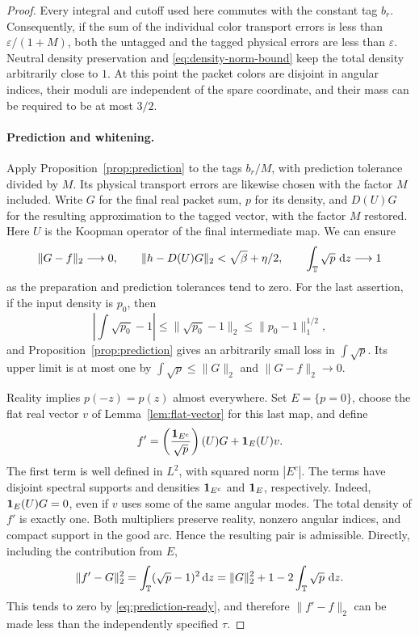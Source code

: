 \begin{proof}
Every integral and cutoff used here commutes with the constant tag
$b_r$.  Consequently, if the sum of the individual color transport
errors is less than $\varepsilon/(1+M)$, both the untagged and the
tagged physical errors are less than $\varepsilon$.  Neutral density
preservation and \eqref{eq:density-norm-bound} keep the total density
arbitrarily close to $1$.  At this point the packet colors are disjoint
in angular indices, their moduli are independent of the spare
coordinate, and their mass can be required to be at most $3/2$.

\paragraph{Prediction and whitening.}
Apply Proposition~\ref{prop:prediction} to the tags $b_r/M$, with
prediction tolerance divided by $M$.  Its physical transport errors
are likewise chosen with the factor $M$ included.  Write $G$ for the
final real packet sum, $p$ for its density, and $D(U)G$ for the
resulting approximation to the tagged vector, with the factor $M$
restored.  Here $U$ is the Koopman operator of the final intermediate
map.  We can ensure
\begin{equation}\label{eq:prediction-ready}
 \|G-f\|_2\longrightarrow0,
 \qquad
 \|h-D(U)G\|_2<\sqrt\beta+\eta/2,
 \qquad
 \int_\mathbb T\sqrt p\,\,\mathrm d z\longrightarrow1
\end{equation}
as the preparation and prediction tolerances tend to zero.  For the
last assertion, if the input density is $p_0$, then
\[
 \left|\int\sqrt{p_0}-1\right|
 \le\|\sqrt{p_0}-1\|_2
 \le\|p_0-1\|_1^{1/2},
\]
and Proposition~\ref{prop:prediction} gives an arbitrarily small loss
in $\int\sqrt p$.  Its upper limit is at most one by
$\int\sqrt p\le\|G\|_2$ and $\|G-f\|_2\to0$.

Reality implies $p(-z)=p(z)$ almost everywhere.  Set $E=\{p=0\}$,
choose the flat real vector $v$ of Lemma~\ref{lem:flat-vector} for this
last map, and define
\begin{equation}\label{eq:whitening}
 f'=\left(\frac{\mathbf 1_{E^c}}{\sqrt p}\right)(U)G+\mathbf 1_E(U)v.
\end{equation}
The first term is well defined in $L^2$, with squared norm $|E^c|$.
The terms have disjoint spectral supports and densities $\mathbf 1_{E^c}$
and $\mathbf 1_E$, respectively.  Indeed, $\mathbf 1_E(U)G=0$, even if $v$ uses some
of the same angular modes.  The total density of $f'$ is exactly one.
Both multipliers preserve reality, nonzero angular indices, and compact
support in the good arc.  Hence the resulting pair is admissible.
Directly, including the contribution from $E$,
\begin{equation}\label{eq:whitening-distance}
 \|f'-G\|_2^2
 =\int_\mathbb T(\sqrt p-1)^2\,\mathrm d z
 =\|G\|_2^2+1-2\int_\mathbb T\sqrt p\,\,\mathrm d z.
\end{equation}
This tends to zero by \eqref{eq:prediction-ready}, and therefore
$\|f'-f\|_2$ can be made less than the independently specified $\tau$.


\end{proof}
